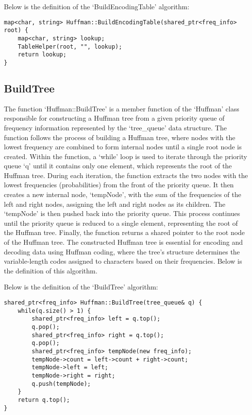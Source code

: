 \begin{highlight}

Below is the definition of the `BuildEncodingTable' algorithm:

\horizontalline

\begin{verbatim}
map<char, string> Huffman::BuildEncodingTable(shared_ptr<freq_info> root) {
    map<char, string> lookup;
    TableHelper(root, "", lookup);
    return lookup;
}
\end{verbatim}

\end{highlight}

\subsection*{BuildTree}

The function `Huffman::BuildTree' is a member function of the `Huffman' class responsible for constructing a Huffman tree from a given priority queue of frequency information represented by the 
`tree\_queue' data structure. The function follows the process of building a Huffman tree, where nodes with the lowest frequency are combined to form internal nodes until a single root node is 
created. Within the function, a `while' loop is used to iterate through the priority queue `q' until it contains only one element, which represents the root of the Huffman tree. During each 
iteration, the function extracts the two nodes with the lowest frequencies (probabilities) from the front of the priority queue. It then creates a new internal node, `tempNode', with the sum of 
the frequencies of the left and right nodes, assigning the left and right nodes as its children. The `tempNode' is then pushed back into the priority queue. This process continues until the 
priority queue is reduced to a single element, representing the root of the Huffman tree. Finally, the function returns a shared pointer to the root node of the Huffman tree. The constructed 
Huffman tree is essential for encoding and decoding data using Huffman coding, where the tree's structure determines the variable-length codes assigned to characters based on their frequencies.
Below is the definition of this algorithm.

\begin{highlight}
    
Below is the definition of the `BuildTree' algorithm:

\horizontalline

\begin{verbatim}
shared_ptr<freq_info> Huffman::BuildTree(tree_queue& q) {
    while(q.size() > 1) {
        shared_ptr<freq_info> left = q.top();
        q.pop();
        shared_ptr<freq_info> right = q.top();
        q.pop();
        shared_ptr<freq_info> tempNode(new freq_info);
        tempNode->count = left->count + right->count;
        tempNode->left = left;
        tempNode->right = right;
        q.push(tempNode);
    }
    return q.top();
}
\end{verbatim}

\end{highlight}

